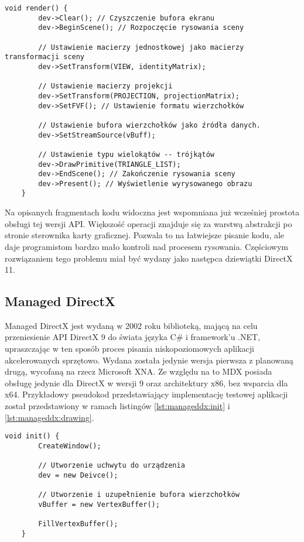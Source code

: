 \begin{lstlisting}[caption={Pseudokod rysowania Direct3D 9}, label={lst:d3d9:render}]
	void render() {
		dev->Clear(); // Czyszczenie bufora ekranu
		dev->BeginScene(); // Rozpoczęcie rysowania sceny
		
		// Ustawienie macierzy jednostkowej jako macierzy transformacji sceny		
		dev->SetTransform(VIEW, identityMatrix);
		
		// Ustawienie macierzy projekcji
		dev->SetTransform(PROJECTION, projectionMatrix);
		dev->SetFVF(); // Ustawienie formatu wierzchołków
		
		// Ustawienie bufora wierzchołków jako źródła danych.
		dev->SetStreamSource(vBuff);
		
		// Ustawienie typu wielokątów -- trójkątów		
		dev->DrawPrimitive(TRIANGLE_LIST);	
		dev->EndScene(); // Zakończenie rysowania sceny		
		dev->Present(); // Wyświetlenie wyrysowanego obrazu
	}
\end{lstlisting}

Na opisanych fragmentach kodu widoczna jest wspomniana już wcześniej
prostota obsługi tej wersji API. Większość operacji znajduje się za
warstwą abstrakcji po stronie sterownika karty graficznej. Pozwala to na
łatwiejsze pisanie kodu, ale daje programistom bardzo mało kontroli nad
procesem rysowania. Częściowym rozwiązaniem tego problemu miał być
wydany jako następca dziewiątki DirectX 11.

\subsection{Managed DirectX}

Managed DirectX jest wydaną w 2002 roku biblioteką, mającą na celu
przeniesienie API DirectX 9 do świata języka C\# i framework'u .NET,
upraszczając w ten sposób proces pisania niskopoziomowych aplikacji
akcelerowanych sprzętowo. Wydana została jedynie wersja pierwsza z planowaną drugą, wycofaną
na rzecz Microsoft XNA. Ze względu na to MDX posiada obsługę jedynie dla DirectX w wersji 9 oraz
architektury x86, bez wsparcia dla x64. Przykładowy pseudokod przedstawiający implementację testowej aplikacji
został przedstawiony w ramach listingów \ref{lst:manageddx:init} i \ref{lst:manageddx:drawing}.

\begin{lstlisting}[caption={Funkcja inicjalizacji przy pomocy Managed DirectX}, label={lst:manageddx:init}]
	void init() {
		CreateWindow();
		
		// Utworzenie uchwytu do urządzenia
		dev = new Deivce();
		
		// Utworzenie i uzupełnienie bufora wierzchołków
		vBuffer = new VertexBuffer();
		
		FillVertexBuffer();
	}
\end{lstlisting}

